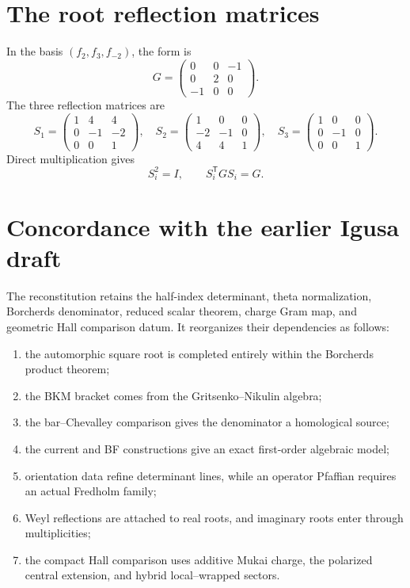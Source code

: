 \chapter{The root reflection matrices}
In the basis $(f_2,f_3,f_{-2})$, the form is
\[
 G=\begin{pmatrix}0&0&-1\\0&2&0\\-1&0&0\end{pmatrix}.
\]
The three reflection matrices are
\[
 S_1=\begin{pmatrix}1&4&4\\0&-1&-2\\0&0&1\end{pmatrix},\quad
 S_2=\begin{pmatrix}1&0&0\\-2&-1&0\\4&4&1\end{pmatrix},\quad
 S_3=\begin{pmatrix}1&0&0\\0&-1&0\\0&0&1\end{pmatrix}.
\]
Direct multiplication gives
\[
 S_i^2=I,
 \qquad S_i^{\mathsf T}GS_i=G.
\]

\chapter{Concordance with the earlier Igusa draft}
The reconstitution retains the half-index determinant, theta normalization, Borcherds denominator, reduced scalar theorem, charge Gram map, and geometric Hall comparison datum. It reorganizes their dependencies as follows:
\begin{enumerate}
\item the automorphic square root is completed entirely within the Borcherds product theorem;
\item the BKM bracket comes from the Gritsenko--Nikulin algebra;
\item the bar--Chevalley comparison gives the denominator a homological source;
\item the current and BF constructions give an exact first-order algebraic model;
\item orientation data refine determinant lines, while an operator Pfaffian requires an actual Fredholm family;
\item Weyl reflections are attached to real roots, and imaginary roots enter through multiplicities;
\item the compact Hall comparison uses additive Mukai charge, the polarized central extension, and hybrid local--wrapped sectors.
\end{enumerate}

